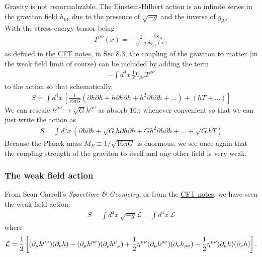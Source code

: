 \documentclass{book}
\theoremstyle{definition}
\newcommand{\p}{\partial}
\newcommand{\lag}{\mathcal{L}}
\newcommand{\f}[2]{\frac{#1}{#2}}
\newcommand{\lb}{\left[}
\newcommand{\rb}{\right]}
\begin{document}
Gravity is not renormalizable. The Einstein-Hilbert action is an infinite series in the graviton field $h_{\mu\nu}$ due to the presence of $\sqrt{-g}$ and the inverse of $g_{\mu\nu}$. \\

With the stress-energy tensor being
\begin{align}
T^{\mu\nu}(x) = -\f{2}{\sqrt{-g}}\f{\delta S_M}{\delta g_{\mu\nu}(x)}
\end{align}
as defined in \href{https://huanqbui.com/LaTeX projects/Classical_Fields_Theory/HuanBui_ClassicalFieldTheory.pdf}{\underline{the CFT notes}}, in Sec 8.3, the coupling of the graviton to matter (in the weak field limit of course) can be included by adding the term
\begin{align}
- \int d^4x\, \f{1}{2}h_{\mu\nu}T^{\mu\nu}
\end{align}
to the action so that schematically,
\begin{align}
S = \int d^4x\, \lb \f{1}{16\pi G}(\p h \p h + h \p h \p h + h^2 \p h \p h + \dots) + (hT + \dots)\rb
\end{align}
We can rescale $h^{\mu\nu} \to \sqrt{G} h^{\mu\nu}$ as absorb $16\pi$ whenever convenient so that we can just write the action as
\begin{align}
S = \int d^4x\, (\p h \p h  + \sqrt{G}h \p h \p h + Gh^2\p h \p h + \dots + \sqrt{G} h T)
\end{align}
Because the Planck mass $M_P \equiv 1/\sqrt{16\pi G} $ is enormous, we see once again that the coupling strength of the graviton to itself and any other field is very weak.



\subsubsection{The weak field action}
     
     
From Sean Carroll's \textit{Spacetime \& Geometry}, or from the \href{https://huanqbui.com/LaTeX projects/Classical_Fields_Theory/HuanBui_ClassicalFieldTheory.pdf}{CFT notes}, we have seen the weak field action:
\begin{align}
S = \int d^4x\, \sqrt{-g}\lag = \int d^4x\, \lag
\end{align}
where
\begin{align}
\lag = \f{1}{2}\lb(\p_\mu h^{\mu\nu})(\p_\nu h) - (\p_\mu h^{\rho\sigma})(\p_\rho \tensor{h}{^\mu_\sigma}) + \f{1}{2} \eta^{\mu\nu}(\p_\mu h^{\rho\sigma})(\p_\nu h_{\rho\sigma})   - \f{1}{2} \eta^{\mu\nu}(\p_\mu h)(\p_\nu h) \rb.
\end{align}
\end{document}
